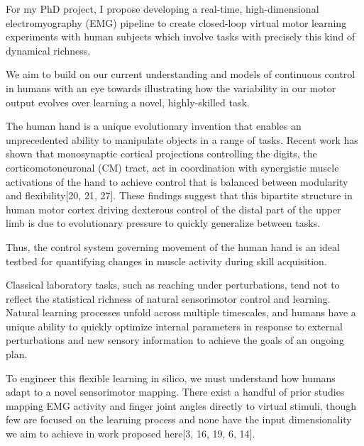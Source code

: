 {            For my PhD project, I propose developing a real-time,
            high-dimensional electromyography (EMG) pipeline to create
            closed-loop virtual motor learning experiments with human
            subjects which involve tasks with precisely this kind of
            dynamical richness.

            We aim to build on our current understanding and models of
            continuous control in humans with an eye towards
            illustrating how the variability in our motor output evolves
            over learning a novel, highly-skilled task.

            The human hand is a unique evolutionary invention that
            enables an unprecedented ability to manipulate objects in a
            range of tasks. Recent work has shown that monosynaptic
            cortical projections controlling the digits, the
            corticomotoneuronal (CM) tract, act in coordination with
            synergistic muscle activations of the hand to achieve
            control that is balanced between modularity and
            flexibility{[}20, 21, 27{]}. These findings suggest that
            this bipartite structure in human motor cortex driving
            dexterous control of the distal part of the upper limb is
            due to evolutionary pressure to quickly generalize between
            tasks.

            Thus, the control system governing movement of the human
            hand is an ideal testbed for quantifying changes in muscle
            activity during skill acquisition.

            Classical laboratory tasks, such as reaching under
            perturbations, tend not to reflect the statistical richness
            of natural sensorimotor control and learning. Natural
            learning processes unfold across multiple timescales, and
            humans have a unique ability to quickly optimize internal
            parameters in response to external perturbations and new
            sensory information to achieve the goals of an ongoing plan.

            To engineer this flexible learning in silico, we must
            understand how humans adapt to a novel sensorimotor mapping.
            There exist a handful of prior studies mapping EMG activity
            and finger joint angles directly to virtual stimuli, though
            few are focused on the learning process and none have the
            input dimensionality we aim to achieve in work proposed
            here{[}3, 16, 19, 6, 14{]}.

}
